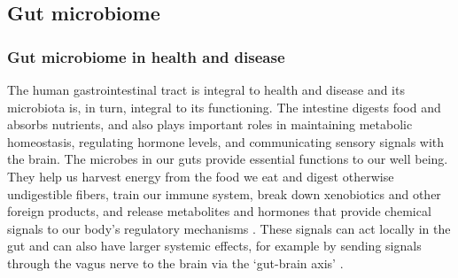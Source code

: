 \documentclass[12pt]{article}
\begin{document}
\subsection{Gut microbiome}

\subsubsection{Gut microbiome in health and disease}

The human gastrointestinal tract is integral to health and disease
and its microbiota is, in turn, integral to its functioning.
The intestine digests food and absorbs nutrients, and  
also plays important roles in maintaining metabolic homeostasis, 
regulating hormone levels, and communicating sensory signals with the brain.
The microbes in our guts provide essential functions to our well being. 
They help us harvest energy from the food we eat and digest otherwise 
undigestible fibers, train our immune system, break down xenobiotics and 
other foreign products, and release metabolites and hormones that provide 
chemical signals to our body's regulatory mechanisms \cite{nash-baker, asd-kb, turnbaugh-energy_harvest-2006}. These signals can act locally in the gut 
and can also have larger systemic effects, for example by sending signals 
through the vagus nerve to the brain via the `gut-brain axis' \cite{asd-kb, asd-son}. 
\end{document}
